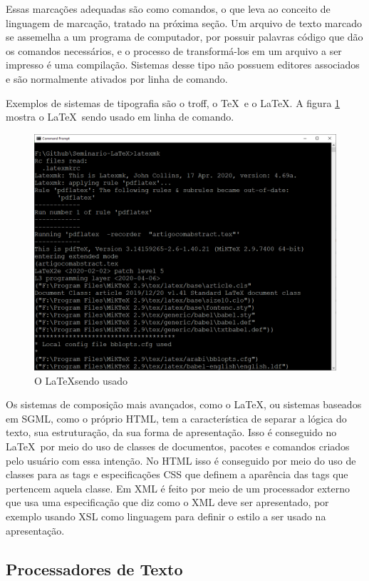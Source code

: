 Essas marcações adequadas são como comandos, o que leva ao conceito de linguagem de marcação, tratado na próxima seção. Um arquivo de texto marcado se assemelha a um programa de computador, por possuir palavras código que dão os comandos necessários, e o processo de transformá-los em um arquivo a ser impresso é uma compilação. Sistemas desse tipo não possuem editores associados e são normalmente ativados por linha de comando.

Exemplos de sistemas de tipografia são o troff, o \TeX\ e o \LaTeX. A figura \ref{fig:latex2} mostra o \LaTeX\  sendo usado em linha de comando.

\begin{figure}[hbt]
    \centering
    \includegraphics[width=0.7\linewidth]{Images/latex2}
    \caption[O \LaTeX sendo usado]{O \LaTeX sendo usado}
    \label{fig:latex2}
\end{figure}

Os sistemas de composição mais avançados, como o \LaTeX, ou sistemas baseados em SGML, como o próprio HTML, tem a característica de separar a lógica do texto, sua estruturação, da sua forma de apresentação. Isso é conseguido no \LaTeX\ por meio do uso de classes de documentos, pacotes e comandos criados pelo usuário com essa intenção. No HTML isso é conseguido por meio do uso de classes para as tags e especificações CSS que definem a aparência das tags que pertencem aquela classe. Em XML é feito por meio de um processador externo que usa uma especificação que diz como o XML deve ser apresentado, por exemplo usando XSL como linguagem para definir o estilo a ser usado na apresentação. 

\subsection{Processadores de Texto}

